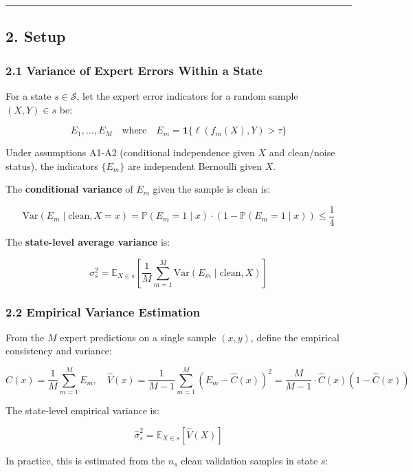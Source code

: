 \documentclass[
  12pt,
]{ctexart}
\begin{document}
\begin{center}\rule{0.5\linewidth}{0.5pt}\end{center}

\subsection{2. Setup}\label{setup}

\subsubsection{2.1 Variance of Expert Errors Within a
State}\label{variance-of-expert-errors-within-a-state}

For a state \(s \in \mathcal{S}\), let the expert error indicators for a
random sample \((X, Y) \in s\) be:

\[E_1, \dots, E_M \quad \text{where} \quad E_m = \mathbf{1}\{\ell(f_m(X), Y) > \tau\}\]

Under assumptions A1-A2 (conditional independence given \(X\) and
clean/noise status), the indicators \(\{E_m\}\) are independent
Bernoulli given \(X\).

The \textbf{conditional variance} of \(E_m\) given the sample is clean
is:

\[\text{Var}(E_m \mid \text{clean}, X = x) = \mathbb{P}(E_m = 1 \mid x) \cdot (1 - \mathbb{P}(E_m = 1 \mid x)) \leq \frac{1}{4}\]

The \textbf{state-level average variance} is:

\[\sigma_s^2 = \mathbb{E}_{X \in s}\left[ \frac{1}{M} \sum_{m=1}^M \text{Var}(E_m \mid \text{clean}, X) \right]\]

\subsubsection{2.2 Empirical Variance
Estimation}\label{empirical-variance-estimation}

From the \(M\) expert predictions on a single sample \((x, y)\), define
the empirical consistency and variance:

\[\hat{C}(x) = \frac{1}{M} \sum_{m=1}^M E_m, \quad
\hat{V}(x) = \frac{1}{M-1} \sum_{m=1}^M (E_m - \hat{C}(x))^2 = \frac{M}{M-1} \cdot \hat{C}(x)(1 - \hat{C}(x))\]

The state-level empirical variance is:

\[\hat{\sigma}_s^2 = \mathbb{E}_{X \in s}[\hat{V}(X)]\]

In practice, this is estimated from the \(n_s\) clean validation samples
in state \(s\):
\end{document}
